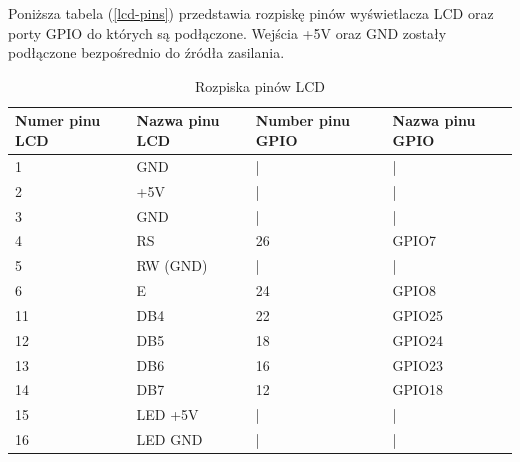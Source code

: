 \documentclass[11pt,a4paper, twoside]{article}
\begin{document}
Poniższa tabela (\ref{lcd-pins}) przedstawia rozpiskę pinów wyświetlacza LCD oraz porty GPIO do których są podłączone. Wejścia +5V oraz GND zostały podłączone bezpośrednio do źródła zasilania.
\begin{table}[H]
\begin{center}
\begin{tabular}{ | l | l | l | l | }
\hline
Numer pinu LCD & Nazwa pinu LCD & Number pinu GPIO & Nazwa pinu GPIO \\ \hline
1 & GND & | &  | \\ \hline
2 & +5V & | &  | \\ \hline
3 & GND & | &  | \\ \hline
4 & RS &  26 & GPIO7 \\ \hline
5 & RW (GND) & | & | \\ \hline 
6 & E & 24 & GPIO8 \\ \hline
11 & DB4 & 22 & GPIO25 \\ \hline
12 & DB5 & 18 & GPIO24 \\ \hline
13 & DB6 & 16 & GPIO23 \\ \hline
14 & DB7 & 12 & GPIO18 \\ \hline
15 & LED +5V & | & | \\ \hline
16 & LED GND & | & | \\ \hline
\end{tabular}
\end{center}
\caption{Rozpiska pinów LCD}
$\label{lcd-pins}$
\end{table}
\end{document}
